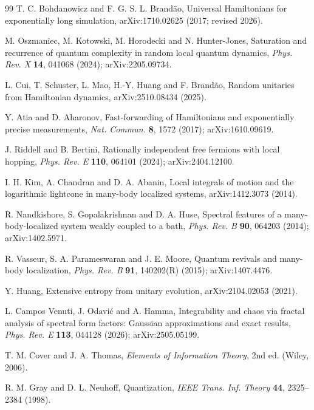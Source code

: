 \begin{thebibliography}{99}
T. C. Bohdanowicz and F. G. S. L. Brand\~ao,
Universal Hamiltonians for exponentially long simulation,
arXiv:1710.02625 (2017; revised 2026).

M. Oszmaniec, M. Kotowski, M. Horodecki and N. Hunter-Jones,
Saturation and recurrence of quantum complexity in random local quantum
dynamics,
\emph{Phys. Rev. X} \textbf{14}, 041068 (2024);
arXiv:2205.09734.

L. Cui, T. Schuster, L. Mao, H.-Y. Huang and F. Brand\~ao,
Random unitaries from Hamiltonian dynamics,
arXiv:2510.08434 (2025).

Y. Atia and D. Aharonov,
Fast-forwarding of Hamiltonians and exponentially precise measurements,
\emph{Nat. Commun.} \textbf{8}, 1572 (2017);
arXiv:1610.09619.

J. Riddell and B. Bertini,
Rationally independent free fermions with local hopping,
\emph{Phys. Rev. E} \textbf{110}, 064101 (2024);
arXiv:2404.12100.

I. H. Kim, A. Chandran and D. A. Abanin,
Local integrals of motion and the logarithmic lightcone in many-body
localized systems,
arXiv:1412.3073 (2014).

R. Nandkishore, S. Gopalakrishnan and D. A. Huse,
Spectral features of a many-body-localized system weakly coupled to a bath,
\emph{Phys. Rev. B} \textbf{90}, 064203 (2014);
arXiv:1402.5971.

R. Vasseur, S. A. Parameswaran and J. E. Moore,
Quantum revivals and many-body localization,
\emph{Phys. Rev. B} \textbf{91}, 140202(R) (2015);
arXiv:1407.4476.

Y. Huang,
Extensive entropy from unitary evolution,
arXiv:2104.02053 (2021).

L. Campos Venuti, J. Odavi\'c and A. Hamma,
Integrability and chaos via fractal analysis of spectral form factors:
Gaussian approximations and exact results,
\emph{Phys. Rev. E} \textbf{113}, 044128 (2026);
arXiv:2505.05199.

T. M. Cover and J. A. Thomas,
\emph{Elements of Information Theory}, 2nd ed. (Wiley, 2006).

R. M. Gray and D. L. Neuhoff,
Quantization,
\emph{IEEE Trans. Inf. Theory} \textbf{44}, 2325--2384 (1998).


\end{thebibliography}
